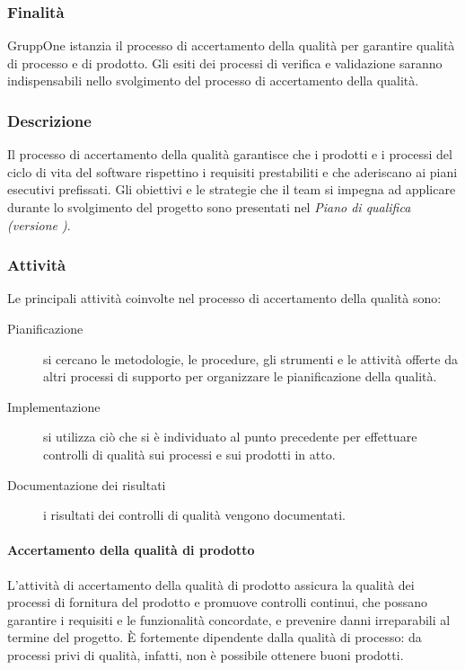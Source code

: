 \documentclass[../../norme-di-progetto.tex]{subfiles}
\begin{document}
\subsubsection{Finalità}%
\label{subs:accertamento_della_qualita/finalita}

GruppOne istanzia il processo di accertamento della qualità per garantire qualità di processo e di prodotto.
Gli esiti dei processi di verifica e validazione saranno indispensabili nello svolgimento del processo di accertamento della qualità.

\subsubsection{Descrizione}%
\label{subs:accertamento_della_qualita/descrizione}

Il processo di accertamento della qualità garantisce che i prodotti e i processi del ciclo di vita del software rispettino i requisiti prestabiliti e che aderiscano ai piani esecutivi prefissati.
Gli obiettivi e le strategie che il team si impegna ad applicare durante lo svolgimento del progetto sono presentati nel \textit{Piano di qualifica (versione \versione)}.

\subsubsection{Attività}%
\label{subs:accertamento_della_qualita/attivita}

Le principali attività coinvolte nel processo di accertamento della qualità sono:

\begin{description}
  \item [Pianificazione] si cercano le metodologie, le procedure, gli strumenti e le attività offerte da altri processi di supporto per organizzare le pianificazione della qualità.
  \item [Implementazione] si utilizza ciò che si è individuato al punto precedente per effettuare controlli di qualità sui processi e sui prodotti in atto.
  \item [Documentazione dei risultati] i risultati dei controlli di qualità vengono documentati.
\end{description}

\paragraph{Accertamento della qualità di prodotto}%
\label{par:accertamento_della_qualita_di_prodotto/attivita}
L'attività di accertamento della qualità di prodotto assicura la qualità dei processi di fornitura del prodotto e promuove controlli continui, che possano garantire i requisiti e le funzionalità concordate, e prevenire danni irreparabili al termine del progetto.
È fortemente dipendente dalla qualità di processo: da processi privi di qualità, infatti, non è possibile ottenere buoni prodotti.
\end{document}
